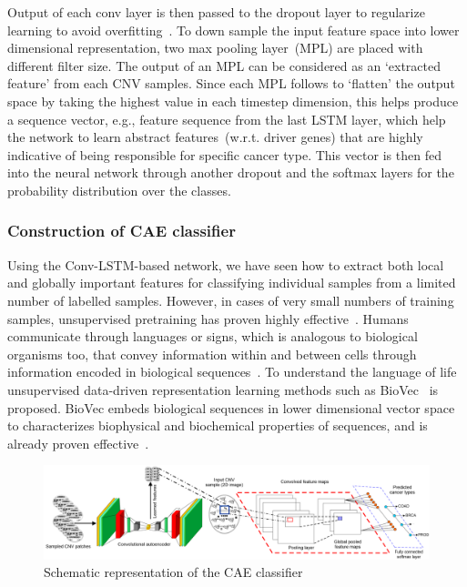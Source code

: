 \hspace*{3.5mm} Output of each conv layer is then passed to the dropout layer to regularize learning to avoid overfitting~\cite{vardropout}. To down sample the input feature space into lower dimensional representation, two max pooling layer~(MPL) are placed with different filter size. The output of an MPL can be considered as an `extracted feature' from each CNV samples. Since each MPL follows to `flatten' the output space by taking the highest value in each timestep dimension, this helps produce a sequence vector, e.g., feature sequence from the last LSTM layer, which help the network to learn abstract features~(w.r.t. driver genes) that are highly indicative of being responsible for specific cancer type. This vector is then fed into the neural network  through another dropout and the softmax layers for the probability distribution over the classes. 

\subsubsection{Construction of CAE classifier}
Using the Conv-LSTM-based network, we have seen how to extract both local and globally important features for classifying individual samples from a limited number of labelled samples. However, in cases of very small numbers of training samples, unsupervised pretraining has proven highly effective~\cite{ae1,ae2,ae3}. 
Humans communicate through languages or signs, which is analogous to biological organisms too, that convey information within and between cells through information encoded in biological sequences~\cite{yue2018deep}. To understand the language of life unsupervised data-driven representation learning methods such as BioVec~\cite{asgari2015continuous} is proposed. BioVec embeds biological sequences in lower dimensional vector space to characterizes biophysical and biochemical properties of sequences, and is already proven effective~\cite{yue2018deep}. 

\begin{figure}[h]
	\centering
	\includegraphics[scale=0.6]{images/cae.png}	
    \caption{Schematic representation of the CAE classifier~\cite{karimACCA2019}}
	\label{fig:cae}
\end{figure}


